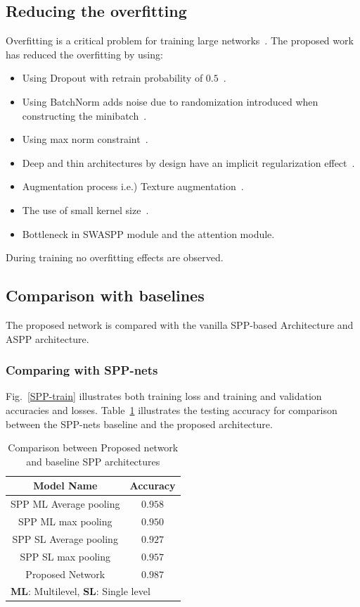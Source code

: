 \subsection{Reducing the overfitting}
Overfitting is a critical problem for training large networks~\cite{krizhevsky2012imagenet}. The proposed work has reduced the overfitting by using:
\begin{itemize}
\item Using Dropout with retrain probability of $0.5$~\cite{srivastava2014dropout}.
\item Using BatchNorm adds noise due to randomization introduced when constructing the minibatch~\cite{ioffe2015batch}.
\item Using max norm constraint~\cite{krizhevsky2012imagenet}.
\item Deep and thin architectures by design have an implicit regularization effect~\cite{he2016deep}. 
\item Augmentation process i.e.) Texture augmentation~\cite{krizhevsky2012imagenet}. 
\item The use of small kernel size~\cite{simonyan2014very}.
\item Bottleneck in SWASPP module and the attention module.
\end{itemize}
During training no overfitting effects are observed.
\subsection{Comparison with baselines}
The proposed network is compared with the vanilla SPP-based Architecture and ASPP architecture.
\subsubsection{Comparing with SPP-nets}
Fig.~\ref{SPP-train} illustrates both training loss and training and validation accuracies and losses. Table~\ref{blaccom} illustrates the testing accuracy for comparison between the SPP-nets baseline and the proposed architecture.
\begin{table}[htbp]
\caption{Comparison between Proposed network and baseline SPP architectures }
\begin{center}
\begin{tabular}{|c|c|}
\hline
\textbf{Model Name}& Accuracy \\
\hline
 SPP ML Average pooling & $0.958$   \\
\hline
SPP ML max pooling & $0.950$   \\
\hline
  SPP SL Average pooling & $0.927$   \\
\hline
  SPP SL max pooling & $0.957$ \\
\hline
Proposed Network & $0.987$\\
\hline
\multicolumn{2}{l}{ \textbf{ML}: Multilevel, \textbf{SL}: Single level}
\end{tabular}
\label{blaccom}
\end{center}
\end{table}
